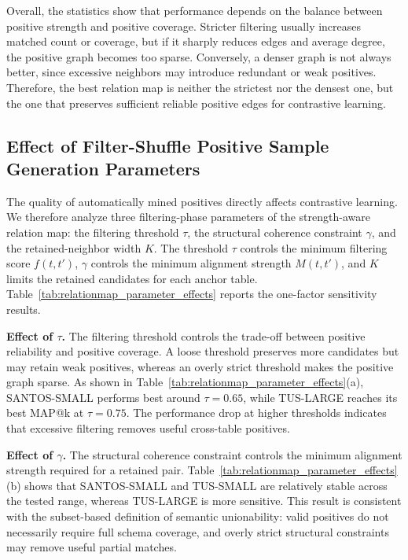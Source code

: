 Overall, the statistics show that performance depends on the balance between
positive strength and positive coverage. Stricter filtering usually increases
matched count or coverage, but if it sharply reduces edges and average degree,
the positive graph becomes too sparse. Conversely, a denser graph is not
always better, since excessive neighbors may introduce redundant or weak
positives. Therefore, the best relation map is neither the strictest nor the
densest one, but the one that preserves sufficient reliable positive edges for
contrastive learning.
\fi

\subsection{Effect of Filter-Shuffle Positive Sample Generation Parameters}
\label{sec_param_analysis}

The quality of automatically mined positives directly affects contrastive learning. We therefore analyze three filtering-phase parameters of the strength-aware relation map: the filtering threshold \(\tau\), the structural coherence constraint \(\gamma\), and the retained-neighbor width \(K\). The threshold \(\tau\) controls the minimum filtering score \(f(t,t')\), \(\gamma\) controls the minimum alignment strength \(M(t,t')\), and \(K\) limits the retained candidates for each anchor table. Table~\ref{tab:relationmap_parameter_effects} reports the one-factor sensitivity results.

\noindent\textbf{Effect of \(\tau\).}
The filtering threshold controls the trade-off between positive reliability and positive coverage. A loose threshold preserves more candidates but may retain weak positives, whereas an overly strict threshold makes the positive graph sparse. As shown in Table~\ref{tab:relationmap_parameter_effects}(a), SANTOS-SMALL performs best around \(\tau=0.65\), while TUS-LARGE reaches its best MAP@k at \(\tau=0.75\). The performance drop at higher thresholds indicates that excessive filtering removes useful cross-table positives.

\noindent\textbf{Effect of \(\gamma\).}
The structural coherence constraint controls the minimum alignment strength required for a retained pair. Table~\ref{tab:relationmap_parameter_effects}(b) shows that SANTOS-SMALL and TUS-SMALL are relatively stable across the tested range, whereas TUS-LARGE is more sensitive. This result is consistent with the subset-based definition of semantic unionability: valid positives do not necessarily require full schema coverage, and overly strict structural constraints may remove useful partial matches.

